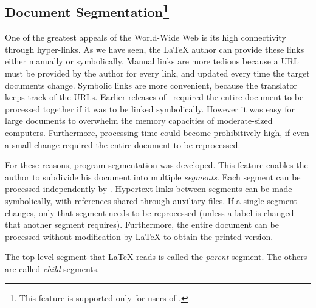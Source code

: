 \subsection{Document Segmentation\protect\footnote{This feature
is supported only for users of \LaTeXe.}\label{Segmentation}}%
\tableofchildlinks*\htmlrule
{}%
\begin{changebar}
One of the greatest appeals of the World-Wide Web is its high
connectivity through hyper-links.  As we have seen, the \LaTeX{} 
author can provide these links either manually or symbolically.
Manual links are more tedious because a URL must be provided
by the author for every link, and updated every time the target
documents change.
%
Symbolic links are more convenient, 
because the translator keeps track of the URLs.  
Earlier releases of \latextohtml\ required the entire document 
to be processed together if it was to be linked symbolically.  
However it was easy for large documents to overwhelm 
the memory capacities of moderate-sized computers.  
Furthermore, processing time could become prohibitively high, 
if even a small change required the entire document to be reprocessed.

%
\html{\\}%
For these reasons, program segmentation was developed.
This feature enables the author to subdivide his document
into multiple \textit{segments}\label{segments}.
Each segment can be processed independently by \latextohtml.
Hypertext links between segments can be made symbolically,
with references shared through auxiliary files.  
If a single segment changes, only that segment needs to be reprocessed 
(unless a label is changed that another segment requires).  
Furthermore, the entire document can be processed 
without modification by \LaTeX{} to obtain the printed version.  

%
\html{\\}\noindent
The top level segment that \LaTeX{} reads is called the \emph{parent} segment.
\html{\\}
The others are called \emph{child} segments.


\end{changebar}
